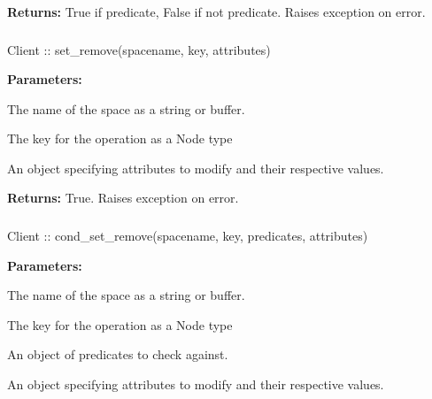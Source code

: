 \noindent\textbf{Returns:}
True if predicate, False if not predicate.  Raises exception on error.

\subsubsection{}
\label{api:nodejs:set_remove}
\begin{javascriptcode}
Client :: set_remove(spacename, key, attributes)
\end{javascriptcode}
\funcdesc 

\noindent\textbf{Parameters:}
\begin{description}[labelindent=\widthof{{\code{attributes}}},leftmargin=*,noitemsep,nolistsep,align=right]
\item[\code{spacename}] The name of the space as a string or buffer.
\item[\code{key}] The key for the operation as a Node type
\item[\code{attributes}] An object specifying attributes to modify and their respective values.
\end{description}

\noindent\textbf{Returns:}
True.  Raises exception on error.

\subsubsection{}
\label{api:nodejs:cond_set_remove}
\begin{javascriptcode}
Client :: cond_set_remove(spacename, key, predicates, attributes)
\end{javascriptcode}
\funcdesc 

\noindent\textbf{Parameters:}
\begin{description}[labelindent=\widthof{{\code{predicates}}},leftmargin=*,noitemsep,nolistsep,align=right]
\item[\code{spacename}] The name of the space as a string or buffer.
\item[\code{key}] The key for the operation as a Node type
\item[\code{predicates}] An object of predicates to check against.
\item[\code{attributes}] An object specifying attributes to modify and their respective values.
\end{description}

